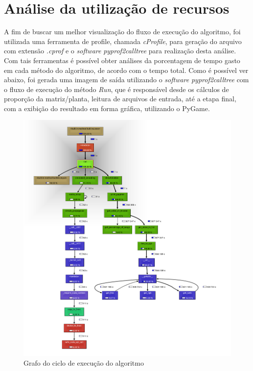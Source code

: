 \documentclass[
	12pt,				%
	twoside,			%
	a4paper,			%
	english,			%
	french,				%
	spanish,			%
	brazil				%
	]{abntex2}
\begin{document}
\section{Análise da utilização de
recursos}\label{anuxe1lise-da-utilizauxe7uxe3o-de-recursos}

A fim de buscar um melhor visualização do fluxo de execução do
algoritmo, foi utilizada uma ferramenta de profile, chamada
\emph{cProfile}, para geração do arquivo com extensão \emph{.cprof} e o
\emph{software} \emph{pyprof2calltree} para realização desta análise.
Com tais ferramentas é possível obter análises da porcentagem de tempo
gasto em cada método do algoritmo, de acordo com o tempo total. Como é
possível ver abaixo, foi gerada uma imagem de saída utilizando o
\emph{software} \emph{pyprof2calltree} com o fluxo de execução do método
\emph{Run}, que é responsável desde os cálculos de proporção da
matriz/planta, leitura de arquivos de entrada, até a etapa final, com a
exibição do resultado em forma gráfica, utilizando o PyGame.

\begin{figure}[ht]
    \caption{\label{cprofile} Grafo do ciclo de execução do algoritmo   }
    \begin{center}
        \includegraphics[scale=0.48]{imagens/graph.jpg}
    \end{center}
\end{figure}
\end{document}
